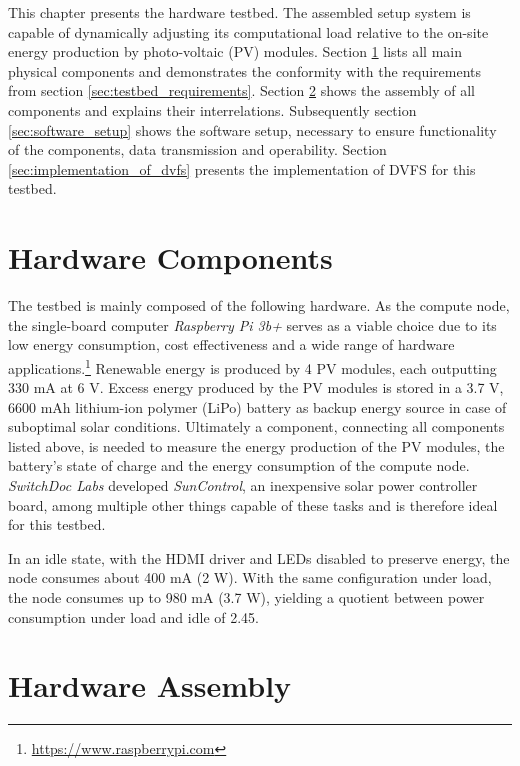 This chapter presents the hardware testbed. The assembled setup system is
capable of dynamically adjusting its computational load relative to the on-site
energy production by photo-voltaic (PV) modules. Section
\ref{sec:hardware_components} lists all main physical components and
demonstrates the conformity with the requirements from section
\ref{sec:testbed_requirements}. Section \ref{sec:hardware_assembly} shows the
assembly of all components and explains their interrelations. Subsequently
section \ref{sec:software_setup} shows the software setup, necessary to ensure
functionality of the components, data transmission and operability. Section
\ref{sec:implementation_of_dvfs} presents the implementation of DVFS for this
testbed.

\section{Hardware Components}
\label{sec:hardware_components}

The testbed is mainly composed of the following hardware. As the compute node,
the single-board computer \emph{Raspberry Pi 3b+} serves as a viable choice due
to its low energy consumption, cost effectiveness and a wide range of hardware
applications.\footnote{\url{https://www.raspberrypi.com}} Renewable energy is
produced by 4 PV modules, each outputting 330 mA at 6 V. Excess energy produced
by the PV modules is stored in a 3.7 V, 6600 mAh lithium-ion polymer (LiPo)
battery as backup energy source in case of suboptimal solar conditions.
Ultimately a component, connecting all components listed above, is needed to
measure the energy production of the PV modules, the battery's state of charge
and the energy consumption of the compute node. \emph{SwitchDoc Labs} developed
\emph{SunControl}, an inexpensive solar power controller board, among multiple
other things capable of these tasks \cite{switchdoc_suncontrol} and is therefore
ideal for this testbed.

In an idle state, with the \textsc{HDMI} driver and \textsc{LED}s disabled to
preserve energy, the node consumes about 400 mA (2 W). With the same
configuration under load, the node consumes up to 980 mA (3.7 W), yielding a
quotient between power consumption under load and idle of 2.45.

\section{Hardware Assembly}
\label{sec:hardware_assembly}

